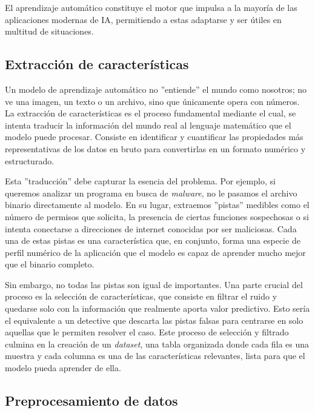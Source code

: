 El aprendizaje automático constituye el motor que impulsa a la mayoría de las aplicaciones modernas de IA, permitiendo a estas adaptarse y ser útiles en multitud de situaciones.

\subsection{Extracción de características}

Un modelo de aprendizaje automático no ''entiende'' el mundo como nosotros; no ve una imagen, un texto o un archivo, sino que únicamente opera con números. La extracción de características es el proceso fundamental mediante el cual, se intenta traducir la información del mundo real al lenguaje matemático que el modelo puede procesar. Consiste en identificar y cuantificar las propiedades más representativas de los datos en bruto para convertirlas en un formato numérico y estructurado.

Esta ''traducción'' debe capturar la esencia del problema. Por ejemplo, si queremos analizar un programa en busca de \textit{malware}, no le pasamos el archivo binario directamente al modelo. En su lugar, extraemos ''pistas'' medibles como el número de permisos que solicita, la presencia de ciertas funciones sospechosas o si intenta conectarse a direcciones de internet conocidas por ser maliciosas. Cada una de estas pistas es una característica que, en conjunto, forma una especie de perfil numérico de la aplicación que el modelo es capaz de aprender mucho mejor que el binario completo.

Sin embargo, no todas las pistas son igual de importantes. Una parte crucial del proceso es la selección de características, que consiste en filtrar el ruido y quedarse solo con la información que realmente aporta valor predictivo. Esto sería el equivalente a un detective que descarta las pistas falsas para centrarse en solo aquellas que le permiten resolver el caso. Este proceso de selección y filtrado culmina en la creación de un \textit{dataset}, una tabla organizada donde cada fila es una muestra y cada columna es una de las características relevantes, lista para que el modelo pueda aprender de ella.

\subsection{Preprocesamiento de datos}

